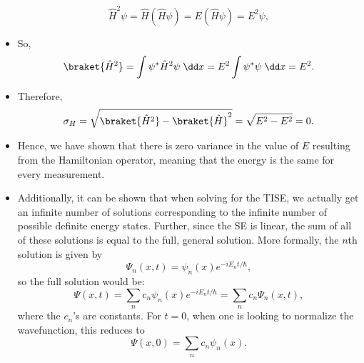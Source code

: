 \begin{itemize}
        \begin{equation}
            \hat{H}^2\psi = \hat{H} \left(\hat{H}\psi\right) = E \left(\hat{H} \psi\right) = E^2\psi,
        \end{equation}
    \item So,
        \begin{equation}
            \braket{\hat{H}^2} = \int \psi^* \hat{H}^2 \psi \;\dd x = E^2 \int \psi^* \psi \;\dd x = E^2.
        \end{equation}
    \item Therefore,
        \begin{equation}
            \sigma_H = \sqrt{\braket{\hat{H}^2} - \braket{\hat{H}}^2} = \sqrt{E^2 - E^2} = 0.
        \end{equation}
    \item Hence, we have shown that there is zero variance in the value of $E$ resulting from the Hamiltonian operator, meaning that the energy is the same for every measurement.
    \item Additionally, it can be shown that when solving for the TISE, we actually get an infinite number of solutions corresponding to the infinite number of possible definite energy states. Further, since the SE is linear, the sum of all of these solutions is equal to the full, general solution. More formally, the $n$th solution is given by
        \begin{equation}
            \Psi_n(x,t) = \psi_n(x) e^{-iE_n t/\hbar},
        \end{equation}
        so the full solution would be:
        \begin{equation}
            \Psi(x,t) = \sum_n c_n \psi_n(x) e^{-iE_nt/\hbar} = \sum_n c_n \Psi_n(x,t),
        \end{equation}
        where the $c_n$'s are constants. For $t=0$, when one is looking to normalize the wavefunction, this reduces to
        \begin{equation}
            \Psi(x,0) = \sum_n c_n \psi_n(x).
        \end{equation}
\end{itemize}


